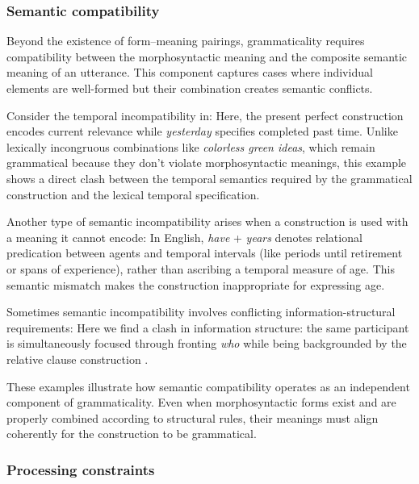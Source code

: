 \documentclass[12pt,letterpaper]{article}
\begin{document}
\subsubsection{Semantic compatibility}\label{sec:semantic-compatibility}

Beyond the existence of form--meaning pairings, grammaticality requires compatibility between the morphosyntactic meaning and the composite semantic meaning of an utterance. This component captures cases where individual elements are well-formed but their combination creates semantic conflicts.

Consider the temporal incompatibility in:
\label{ex:tense-sem}
\z
Here, the present perfect construction encodes current relevance while \textit{yesterday} specifies completed past time. Unlike lexically incongruous combinations like \textit{colorless green ideas}, which remain grammatical because they don't violate morphosyntactic meanings, this example shows a direct clash between the temporal semantics required by the grammatical construction and the lexical temporal specification.

Another type of semantic incompatibility arises when a construction is used with a meaning it cannot encode:
\label{ex:have-years-sem}
\z
In English, \textit{have }+\textit{ years} denotes relational predication between agents and temporal intervals (like periods until retirement or spans of experience), rather than ascribing a temporal measure of age. This semantic mismatch makes the construction inappropriate for expressing age.

Sometimes semantic incompatibility involves conflicting information-structural requirements:
\z
Here we find a clash in information structure: the same participant is simultaneously focused through fronting \textit{who} while being backgrounded by the relative clause construction \autocite{CuneoGoldberg2023}.

These examples illustrate how semantic compatibility operates as an independent component of grammaticality. Even when morphosyntactic forms exist and are properly combined according to structural rules, their meanings must align coherently for the construction to be grammatical.

\subsubsection{Processing constraints}\label{sec:processing-constraints}
\end{document}
